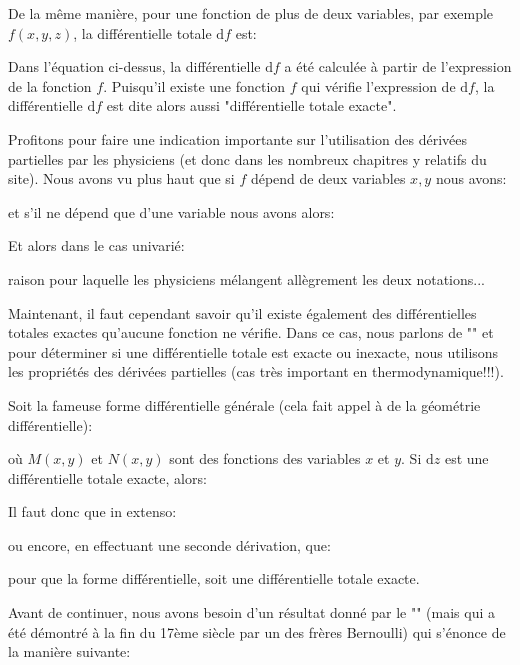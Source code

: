 	\begin{tcolorbox}[title=Remarque,colframe=black,arc=10pt]
	De la même manière, pour une fonction de plus de deux variables, par exemple $f(x,y,z)$, la différentielle totale $\mathrm{d}f$ est:
	
	Dans l'équation ci-dessus, la différentielle $\mathrm{d}f$ a été calculée à partir de l'expression de la fonction $f$. Puisqu'il existe une fonction $f$ qui vérifie l'expression de $\mathrm{d}f$, la différentielle $\mathrm{d}f$ est dite alors aussi "différentielle totale exacte".
	\end{tcolorbox}	
	Profitons pour faire une indication importante sur l'utilisation des dérivées partielles par les physiciens (et donc dans les nombreux chapitres y relatifs du site). Nous avons vu plus haut que si $f$ dépend de deux variables $x, y$ nous avons:
	
	et s'il ne dépend que d'une variable nous avons alors:
	
	Et alors dans le cas univarié:
	
	raison pour laquelle les physiciens mélangent allègrement les deux notations...
	
	Maintenant, il faut cependant savoir qu'il existe également des différentielles totales exactes qu'aucune fonction ne vérifie. Dans ce cas, nous parlons de "\label{total inexact derivative}" et pour déterminer si une différentielle totale est exacte ou inexacte, nous utilisons les propriétés des dérivées partielles (cas très important en thermodynamique!!!).
	
	Soit la fameuse forme différentielle générale (cela fait appel à de la géométrie différentielle):
	
	où $M (x, y)$ et $N (x, y)$ sont des fonctions des variables $x$ et $y$. Si $\mathrm{d}z$ est une différentielle totale exacte, alors:
	
	Il faut donc que in extenso:
	
	ou encore, en effectuant une seconde dérivation, que: 
	
	pour que la forme différentielle, soit une différentielle totale exacte.
	
	Avant de continuer, nous avons besoin d'un résultat donné par le "\label{Schwarz theorem}" (mais qui a été démontré à la fin du 17ème siècle par un des frères Bernoulli) qui s'énonce de la manière suivante:
	
